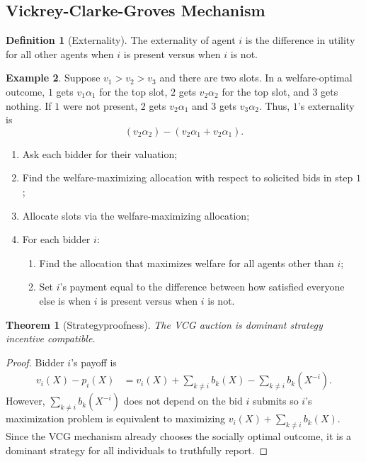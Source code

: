 \documentclass[dvipsnames]{article}
\newtheorem{theorem}{Theorem}[section]
\theoremstyle{definition}
\newtheorem{definition}{Definition}[section]
\newtheorem{example}[definition]{Example}
\theoremstyle{remark}
\newenvironment{mech}[1]{\begin{tcolorbox}[colback=red!5!white,colframe=red!75!black,title={#1}]}{\end{tcolorbox}}
\begin{document}
\subsection{Vickrey-Clarke-Groves Mechanism}
\begin{definition}[Externality]
	The externality of agent $i$ is the difference in utility for all other agents when $i$ is present versus when $i$ is not.
\end{definition}

\begin{example}
	Suppose $v_1 > v_2 > v_3$ and there are two slots. In a welfare-optimal outcome, $1$ gets $v_1 \alpha_1$ for the top slot, $2$ gets $v_2 \alpha_2$ for the top slot, and $3$ gets nothing. If $1$ were not present, $2$ gets $v_2 \alpha_1$ and $3$ gets $v_3 \alpha_2$. Thus, $1$'s externality is
	$$(v_2 \alpha_2) - (v_2 \alpha_1 + v_2 \alpha_1).$$
\end{example}

\begin{mech}{VCG Mechanism}
	\begin{enumerate}
		\item Ask each bidder for their valuation;
		\item Find the welfare-maximizing allocation with respect to solicited bids in step $1$;
		\item Allocate slots via the welfare-maximizing allocation;
		\item For each bidder $i$:
		\begin{enumerate}
			\item Find the allocation that maximizes welfare for all agents other than $i$;
			\item Set $i$'s payment equal to the difference between how satisfied everyone else is when $i$ is present versus when $i$ is not.
		\end{enumerate}
	\end{enumerate}
\end{mech}

\begin{theorem}[Strategyproofness]
	The VCG auction is dominant strategy incentive compatible.
\end{theorem}

\begin{proof}
	Bidder $i$'s payoff is
	\begin{equation*}
		\begin{split}
			v_i(X) - p_i(X) &= v_i(X) + \sum_{k \neq i} b_k(X) -  \sum_{k \neq i} b_k(X^{-i}).
		\end{split}
	\end{equation*}
	However, $\sum_{k \neq i} b_k(X^{-i})$ does not depend on the bid $i$ submits so $i$'s maximization problem is equivalent to maximizing $v_i(X) + \sum_{k \neq i} b_k(X)$. Since the VCG mechanism already chooses the socially optimal outcome, it is a dominant strategy for all individuals to truthfully report.
\end{proof}
\end{document}

